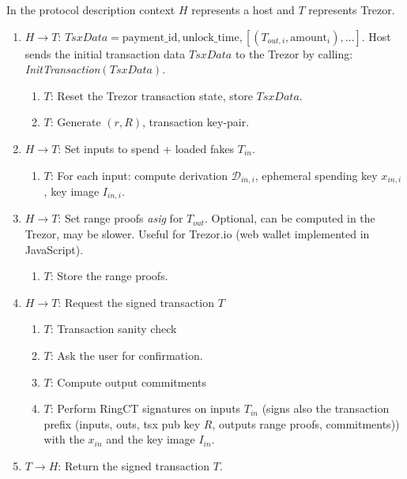 \documentclass[]{article}
\begin{document}
In the protocol description context $H$ represents a host and $T$ represents Trezor.
\begin{enumerate}
	\item $H \rightarrow T$: $TsxData = \text{payment\_id},\text{unlock\_time},  \left[\left(T_{out,i}, \text{amount}_i \right), \dots \right]$. Host sends the initial transaction data $TsxData$ to the Trezor by calling: \emph{InitTransaction}$\left(TsxData\right)$.
	
	\begin{enumerate}
		\item $T$: Reset the Trezor transaction state, store $TsxData$.
		
		\item $T$: Generate $(r, R)$, transaction key-pair.		
	\end{enumerate}
	
	\item $H \rightarrow T$: Set inputs to spend + loaded fakes $T_{in}$. 
	\begin{enumerate}
		\item $T$: For each input: compute derivation $\mathcal{D}_{in,i}$, ephemeral spending key $x_{in,i}$, key image $I_{in,i}$.
	\end{enumerate}
	
	\item $H \rightarrow T$: Set range proofs \emph{asig} for $T_{out}$. Optional, can be computed in the Trezor, may be slower. Useful for Trezor.io (web wallet implemented in JavaScript).
	\begin{enumerate}
		\item $T$: Store the range proofs.
	\end{enumerate}
	
	\item $H \rightarrow T$: Request the signed transaction $T$
	\begin{enumerate}
		\item $T$: Transaction sanity check
		
        \item $T$: Ask the user for confirmation.

		\item $T$: Compute output commitments
		
		\item $T$: Perform RingCT signatures on inputs $T_{in}$ (signs also the transaction prefix (inputs, outs, tsx pub key $R$, outputs range proofs, commitments)) with the $x_{in}$ and the key image $I_{in}$.
	\end{enumerate} 
	
	\item $T \rightarrow H$: Return the signed transaction $T$.
\end{enumerate}
\end{document}
